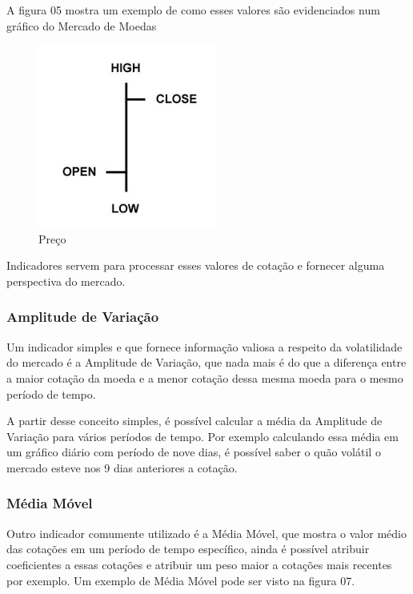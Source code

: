 A figura 05 mostra um exemplo de como esses valores são evidenciados num gráfico do Mercado de Moedas

\begin{figure}[h]
	\centering
	\includegraphics[keepaspectratio=true,scale=1]{figuras/data.png}
	\caption{Preço \cite{blue}}
	\label{fig05}
\end{figure}

Indicadores servem para processar esses valores de cotação e fornecer alguma perspectiva do mercado.

\subsubsection{Amplitude de Variação}

Um indicador simples e que fornece informação valiosa a respeito da volatilidade do mercado é a Amplitude de Variação, que nada mais é do que
a diferença entre a maior cotação da moeda e a menor cotação dessa mesma moeda para o mesmo período de tempo. \cite{investopedia}


A partir desse conceito
simples, é possível calcular a média da Amplitude de Variação para vários períodos de tempo. Por exemplo calculando essa média em um gráfico diário
com período de nove dias, é possível saber o quão volátil o mercado esteve nos 9 dias anteriores a cotação.

\subsubsection{Média Móvel}

Outro indicador comumente utilizado é a Média Móvel, que mostra o valor médio das cotações em um período de tempo específico,
ainda é possível atribuir coeficientes a essas cotações e atribuir um peso maior a cotações mais recentes por exemplo. Um exemplo de
Média Móvel pode ser visto na figura 07. \cite{investopedia}


